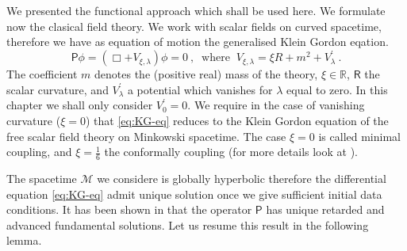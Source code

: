 \documentclass[10pt]{book}
\newcommand{\Mcal}{\mathcal{M}}
\newcommand{\Rbb}{\mathbb{R}}
\newcommand{\Psf}{\mathsf{P}}
\newcommand{\Rsf}{\mathsf{R}}
\theoremstyle{break}
\begin{document}
We presented the functional approach which shall be used here. We formulate now the clasical field theory. We work with scalar fields on curved spacetime, therefore we have as equation of motion the generalised Klein Gordon eqation.%
%
\begin{equation} 
\Psf \phi = \left( \Box + V_{\xi,\lambda} \right) \phi = 0 \ , \
\mbox{ where } \ V_{\xi,\lambda} = \xi R + m^2 + V^\prime_\lambda \ . 
\label{eq:KG-eq}
\end{equation}
%
The coefficient $m$ denotes the (positive real) mass of the theory, $\xi \in \Rbb$, $\Rsf$ the scalar curvature, and $V^\prime_\lambda$ a potential which vanishes for $\lambda$ equal to zero. In this chapter we shall only consider $V^\prime_0=0$. We require in the case of vanishing curvature ($\xi=0$) that \eqref{eq:KG-eq} reduces to the Klein Gordon equation of the free scalar field theory on Minkowski spacetime. The case $\xi=0$ is called minimal coupling, and $\xi=\frac16$ the conformally coupling (for more details look at \cite{waldGR}).


\bigskip


The spacetime $\Mcal$ we considere is globally hyperbolic therefore the differential equation \eqref{eq:KG-eq} admit unique solution once we give sufficient initial data conditions. It has been shown in \cite{baer_wave_2008} that the operator $\Psf$ has unique retarded and advanced fundamental solutions. Let us resume this result in the following lemma.
\end{document}

